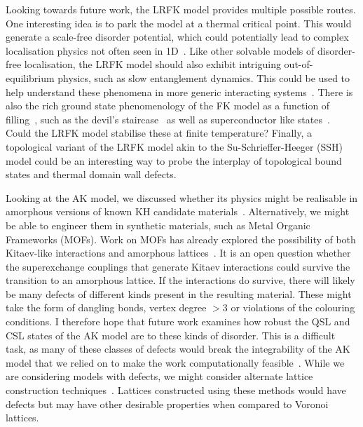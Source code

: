 Looking towards future work, the LRFK model provides multiple possible routes. One interesting idea is to park the model at a thermal critical point. This would generate a scale-free disorder potential, which could potentially lead to complex localisation physics not often seen in 1D~\autocite{aubryAnalyticityBreakingAnderson1980,shimasakiAnomalousLocalizationMultifractality2022}. Like other solvable models of disorder-free localisation, the LRFK model should also exhibit intriguing out-of-equilibrium physics, such as slow entanglement dynamics. This could be used to help understand these phenomena in more generic interacting systems~\autocite{hartLogarithmicEntanglementGrowth2021}. There is also the rich ground state phenomenology of the FK model as a function of filling~\autocite{gruberGroundStatesSpinless1990}, such as the devil's staircase~\autocite{michelettiCompleteDevilStaircase1997} as well as superconductor like states~\autocite{caiVisualizingEvolutionMott2016}. Could the LRFK model stabilise these at finite temperature? Finally, a topological variant of the LRFK model akin to the Su-Schrieffer-Heeger (SSH) model could be an interesting way to probe the interplay of topological bound states and thermal domain wall defects.

Looking at the AK model, we discussed whether its physics might be realisable in amorphous versions of known KH candidate materials~\autocite{TrebstPhysRep2022}. Alternatively, we might be able to engineer them in synthetic materials, such as Metal Organic Frameworks (MOFs). Work on MOFs has already explored the possibility of both Kitaev-like interactions and amorphous lattices~\autocite{yamadaDesigningKitaevSpin2017,bennett2014amorphous}. It is an open question whether the superexchange couplings that generate Kitaev interactions could survive the transition to an amorphous lattice. If the interactions do survive, there will likely be many defects of different kinds present in the resulting material. These might take the form of dangling bonds, vertex degree \(> 3\) or violations of the colouring conditions. I therefore hope that future work examines how robust the QSL and CSL states of the AK model are to these kinds of disorder. This is a difficult task, as many of these classes of defects would break the integrability of the AK model that we relied on to make the work computationally feasible~\autocite{Rau2014,Chaloupka2010,Chaloupka2013,Chaloupka2015,Winter2016}. While we are considering models with defects, we might consider alternate lattice construction techniques~\autocite{agarwala2019topological,christRandomLatticeField1982}. Lattices constructed using these methods would have defects but may have other desirable properties when compared to Voronoi lattices.

